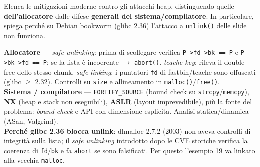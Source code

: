\question[6]
Elenca le mitigazioni moderne contro gli attacchi heap, distinguendo quelle \textbf{dell'allocatore} dalle difese \textbf{generali del sistema/compilatore}. In particolare, spiega perché su Debian bookworm (glibc 2.36) l'attacco a \lstinline|unlink()| delle slide non funziona.
\begin{solution}
\textbf{Allocatore} --- \emph{safe unlinking}: prima di scollegare verifica \lstinline|P->fd->bk == P| e \lstinline|P->bk->fd == P|; se la lista è incoerente $\to$ \lstinline|abort()|. \emph{tcache key}: rileva il double-free dello stesso chunk. \emph{safe-linking}: i puntatori \lstinline|fd| di fastbin/tcache sono offuscati (glibc $\ge$ 2.32). Controlli su \lstinline|size| e allineamento in \lstinline|malloc()|/\lstinline|free()|.\\
\textbf{Sistema / compilatore} --- \lstinline|FORTIFY_SOURCE| (bound check su \lstinline|strcpy|/\lstinline|memcpy|), \textbf{NX} (heap e stack non eseguibili), \textbf{ASLR} (layout imprevedibile), più la fonte del problema: \emph{bound check} e API con dimensione esplicita. Analisi statica/dinamica (ASan, Valgrind).\\
\textbf{Perché glibc 2.36 blocca unlink}: dlmalloc 2.7.2 (2003) non aveva controlli di integrità sulla lista; il \emph{safe unlinking} introdotto dopo le CVE storiche verifica la coerenza di \lstinline|fd|/\lstinline|bk| e fa \lstinline|abort| se sono falsificati. Per questo l'esempio 19 va linkato alla vecchia \lstinline|malloc|.
\end{solution}
